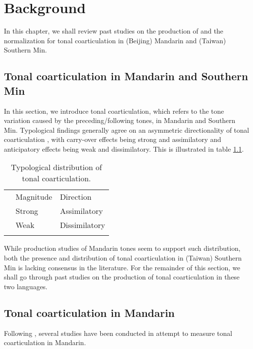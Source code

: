 
\chapter{Background}\label{chapter:Background}

In this chapter, we shall review past studies on the production of and the normalization for tonal coarticulation in (Beijing) Mandarin and (Taiwan) Southern Min. 
\section{Tonal coarticulation in Mandarin and Southern Min}\label{section:Tonal coarticulation in Mandarin and Southern Min}
In this section, we introduce tonal coarticulation, which refers to the tone variation caused by the preceding/following tones, in Mandarin and Southern Min. Typological findings generally agree on an asymmetric directionality of tonal coarticulation \citep{ChangHsieh2012}, with carry-over effects being strong and assimilatory and anticipatory effects being weak and dissimilatory. This is illustrated in table \ref{table:Typologicaldistribution}.

\begin{flushleft}
\begin{table}[hbt!]
\begin{tabularx}{\textwidth}{l|X|X|}
\hhline{~|--}
 & Magnitude & Direction \\
\hhline{~|--}\noalign{\vspace*{\doublerulesep}}
\hhline{-||--}
\multicolumn{1}{|l||}{Carry-over} & Strong & Assimilatory\\
\hhline{-||--}
\multicolumn{1}{|l||}{Anticipatory} & Weak & Dissimilatory\\
\hhline{-||--}
\end{tabularx}
\caption{Typological distribution of tonal coarticulation.}
\label{table:Typologicaldistribution}
\end{table}
\end{flushleft}

While production studies of Mandarin tones seem to support such distribution, both the presence and distribution of tonal coarticulation in (Taiwan) Southern Min is lacking consensus in the literature. For the remainder of this section, we shall go through past studies on the production of tonal coarticulation in these two languages.

\section{Tonal coarticulation in Mandarin}\label{section:Tonal coarticulation in Mandarin}
Following \cite{Chao1968}, several studies have been conducted in attempt to measure tonal coarticulation in Mandarin.

